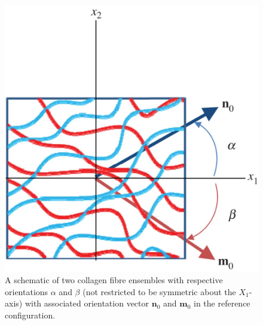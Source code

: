    
\begin{figure}
\centering
\includegraphics[width=\textwidth]{Images/chapter3/F7large.jpg}
\caption{A schematic of two collagen fibre ensembles with respective orientations $\alpha$ and $\beta$ (not restricted to be symmetric about the $X_1$-axis) with associated orientation vector $\mathbf{n}_0$ and $\mathbf{m}_0$ in the reference configuration.}
\label{c3:fig:7}
\end{figure}
    
